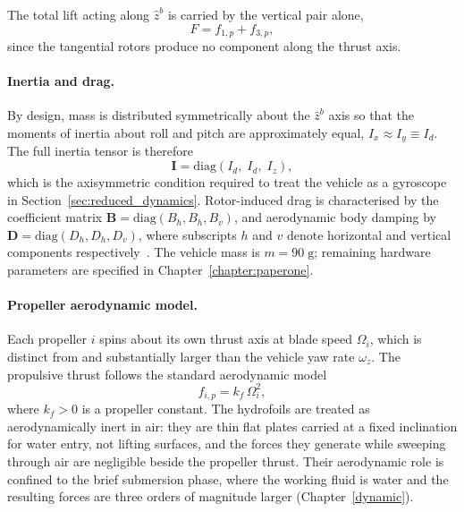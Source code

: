 The total lift acting along $\hat{z}^b$ is carried by the vertical pair alone,
\begin{equation}
    F = f_{1,p} + f_{3,p},
    \label{eq:total_thrust_def}
\end{equation}
since the tangential rotors produce no component along the thrust axis.

\paragraph{Inertia and drag.}
By design, mass is distributed symmetrically about the $\hat{z}^b$ axis so
that the moments of inertia about roll and pitch are approximately equal,
$I_x \approx I_y \equiv I_d$.  The full inertia tensor is therefore
\begin{equation}
    \boldsymbol{I} = \mathrm{diag}(I_d,\;I_d,\;I_z),
    \label{eq:inertia}
\end{equation}
which is the axisymmetric condition required to treat the vehicle as a
gyroscope in Section~\ref{sec:reduced_dynamics}.  Rotor-induced drag is
characterised by the coefficient matrix
$\boldsymbol{B} = \mathrm{diag}(B_h, B_h, B_v)$, and aerodynamic body
damping by $\boldsymbol{D} = \mathrm{diag}(D_h, D_h, D_v)$, where subscripts
$h$ and $v$ denote horizontal and vertical components
respectively~\cite{bai2022splitflyerair}.  The vehicle mass is $m = 90\;\mathrm{g}$;
remaining hardware parameters are specified in Chapter~\ref{chapter:paperone}.

\paragraph{Propeller aerodynamic model.}
Each propeller $i$ spins about its own thrust axis at blade speed $\Omega_i$,
which is distinct from and substantially larger than the vehicle yaw rate
$\omega_z$.  The propulsive thrust follows the standard aerodynamic model
\begin{equation}
    f_{i,p} = k_f\,\Omega_i^2,
    \label{eq:thrust_model}
\end{equation}
where $k_f > 0$ is a propeller constant.  The hydrofoils are treated as
aerodynamically inert in air: they are thin flat plates carried at a fixed
inclination for water entry, not lifting surfaces, and the forces they generate
while sweeping through air are negligible beside the propeller thrust.  Their
aerodynamic role is confined to the brief submersion phase, where the working
fluid is water and the resulting forces are three orders of magnitude larger
(Chapter~\ref{dynamic}).


